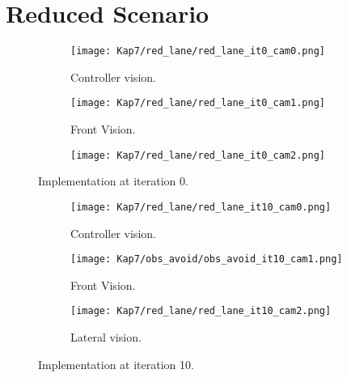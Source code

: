 \section{Reduced Scenario}

\begin{figure}
\centering
\begin{subfigure}[t]{\textwidth}
    \texttt{[image: Kap7/red\_lane/red\_lane\_it0\_cam0.png]}
    \caption{Controller vision.}
    \label{fig:first}
\end{subfigure}
\vspace{1cm}
\begin{subfigure}[b]{0.4\textwidth}
    \texttt{[image: Kap7/red\_lane/red\_lane\_it0\_cam1.png]}
    \caption{Front Vision.}
    \label{fig:second}
\end{subfigure}
\hfill
\begin{subfigure}[b]{0.50\textwidth}
    \texttt{[image: Kap7/red\_lane/red\_lane\_it0\_cam2.png]}
    \label{fig:third}
\end{subfigure}
\caption{Implementation at iteration 0.}
\label{fig:figures}
\end{figure}





\begin{figure}
\centering
\begin{subfigure}[t]{\textwidth}
    \texttt{[image: Kap7/red\_lane/red\_lane\_it10\_cam0.png]}
    \caption{Controller vision.}
    \label{fig:first}
\end{subfigure}
\vspace{1cm}
\begin{subfigure}[b]{0.4\textwidth}
    \texttt{[image: Kap7/obs\_avoid/obs\_avoid\_it10\_cam1.png]}
    \caption{Front Vision.}
    \label{fig:second}
\end{subfigure}
\hfill
\begin{subfigure}[b]{0.50\textwidth}
    \texttt{[image: Kap7/red\_lane/red\_lane\_it10\_cam2.png]}
    \caption{Lateral vision.}
    \label{fig:third}
\end{subfigure}
\caption{Implementation at iteration 10.}
\label{fig:figures}
\end{figure}




